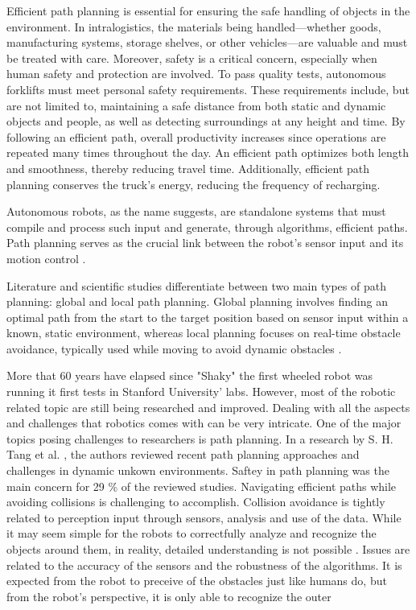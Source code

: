 Efficient path planning is essential for ensuring the safe handling of objects in the environment. 
In intralogistics, the materials being handled—whether goods, manufacturing systems, storage 
shelves, or other vehicles—are valuable and must be treated with care. Moreover, safety is a 
critical concern, especially when human safety and protection are involved. To pass quality 
tests, autonomous forklifts must meet personal safety requirements. These requirements include, 
but are not limited to, maintaining a safe distance from both static and dynamic objects and 
people, as well as detecting surroundings at any height and time. By following an efficient 
path, overall productivity increases since operations are repeated many times throughout the 
day. An efficient path optimizes both length and smoothness, thereby reducing travel time. 
Additionally, efficient path planning conserves the truck's energy, reducing the frequency of recharging.

Autonomous robots, as the name suggests, are 
standalone systems that must compile and process such input and generate, through algorithms, 
efficient paths. Path planning serves as the crucial 
link between the robot’s sensor input and its motion control \cite{R10}.

Literature and scientific studies differentiate between two main types of path planning: 
global and local path planning. Global planning involves finding an optimal path from 
the start to the target position based on sensor input within a known, static environment, 
whereas local planning focuses on real-time obstacle avoidance, typically used while 
moving to avoid dynamic obstacles \cite{R11}.

More that 60 years have elapsed since "Shaky" the first wheeled robot was running it first tests
in Stanford University' labs. However, most of the robotic related topic are still being researched and improved.
Dealing with all the aspects and challenges that robotics comes with can be very intricate. One of the major 
topics posing challenges to researchers is path planning. 
In a research by S. H. Tang et al. \cite{R20}, the authors reviewed recent path planning approaches and challenges
in dynamic unkown environments. 
Saftey in path planning was the main concern for 29 \% of the reviewed studies. Navigating efficient 
paths while avoiding collisions is challenging to accomplish. Collision avoidance is tightly related to perception 
input through sensors, analysis and use of the data. While it may seem simple for the robots to correctfully analyze 
and recognize the objects around them, in reality, detailed understanding is not possible \cite{R21}. Issues are 
related to the accuracy of the sensors and the robustness of the algorithms. It is expected from the robot to 
preceive of the obstacles just like humans do, but from the robot's perspective, it is only able to recognize the outer






